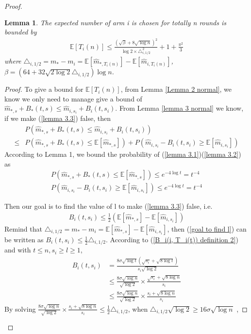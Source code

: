 \documentclass{article}
\theoremstyle{plain}
\newtheorem{lemma}{Lemma}
\begin{document}
\begin{proof}
\begin{lemma}
\label{Lemma 4: bound for E[T_i(n)]}
    The expected number of arm i is chosen for totally n rounds is bounded by 
    \begin{align}
        \mathbb{E}[T_i(n)] \leq  \frac{(\sqrt{\beta} + 8 \sqrt{\log n})^2}{\log 2 \times \triangle_{i, 1/2}^2} + 1 + \frac{\pi^2}{3}
    \end{align}
    where $\triangle_{i, 1/2} = m_\ast - m_i = \mathbb{E}[\hat{m}_{\ast, T_i(n)}] - \mathbb{E}[\hat{m}_{i,T_i(n)}]$, $\beta = (64 + 32 \sqrt{2 \log 2} \triangle_{i,1/2} )\log n$.
\end{lemma}

\begin{proof}
To give a bound for $\mathbb{E}[T_i(n)]$, from Lemma \ref{Lemma 2 normal}, we know we only need to manage give a bound of $\hat{m}_{*, s} + B_*(t, s)  \leq \hat{m}_{i, s_i} + B_i(t, s_i)$. From Lemma \ref{lemma 3 normal} we know, if we make (\ref{lemma 3.3}) false, then 
\begin{align}
    & P(\hat{m}_{*, s} + B_*(t, s)  \leq \hat{m}_{i, s_i} + B_i(t, s_i)) \\
    \leq &  P(\hat{m}_{*, s} + B_*(t, s) \leq  \mathbb{E}[\hat{m}_{*, s}]) + P(\hat{m}_{i, s_i} - B_i(t, s_i) \geq \mathbb{E}[\hat{m}_{i, s_i}])
\end{align}
According to Lemma 1, we bound the probability of (\ref{lemma 3.1})(\ref{lemma 3.2}) as
    \begin{align}
        P(\hat{m}_{*, s} + B_*(t, s) \leq  \mathbb{E}[\hat{m}_{*, s}]) \leq  e^{-4\log t} = t^{-4}\\
        P(\hat{m}_{i, s_i} - B_i(t, s_i) \geq \mathbb{E}[\hat{m}_{i, s_i}])  \leq  e^{-4\log t} = t^{-4}
    \end{align}
    
    Then our goal is to find the value of l to make (\ref{lemma 3.3}) false, i.e. 
    \begin{align}
    \label{goal to find l}
        B_i(t, s_i) \leq  \frac{1}{2}(\mathbb{E}[\hat{m}_{*, s}] - \mathbb{E}[\hat{m}_{i, s_i}])
    \end{align}
    Remind that $\triangle_{i, 1/2} = m_* - m_i = \mathbb{E}[\hat{m}_{*, s}] - \mathbb{E}[\hat{m}_{i, s_i}]$, then (\ref{goal to find l}) can be written as $B_i(t, s_i) \leq  \frac{1}{2} \triangle_{i, 1/2}$. According to (\ref{B_i(i, T_i(t)) definition 2}) and with $t \leq n, s_i \geq l \geq 1$, 
    \begin{align}
        B_i(t, s_i) &= \frac{8 \sigma \sqrt{\log t} (\sqrt{ s_i} + \sqrt{8\log t})}{ s_i  \sqrt{\log 2}}\\
        & \leq \frac{8\sigma \sqrt{\log n}}{  \sqrt{\log 2}} \times \frac{\sqrt{s_i} + \sqrt{8\log n}}{s_i}\\
        & \leq \frac{8\sigma \sqrt{\log n}}{  \sqrt{\log 2}} \times \frac{s_i + \sqrt{8\log n}}{s_i}
    \end{align}
    By solving $\frac{8\sigma \sqrt{\log n}}{  \sqrt{\log 2}} \times \frac{s_i + \sqrt{8\log n}}{s_i} \leq \frac{1}{2} \triangle_{i, 1/2}$, when $ \triangle_{i, 1/2} \sqrt{\log 2} \geq 16 \sigma \sqrt{\log n}$ , 
    

\end{proof}
\end{proof}
\end{document}
